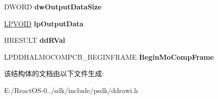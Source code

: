 \begin{DoxyCompactItemize}
\item 
\mbox{\label{struct___d_d_h_a_l___b_e_g_i_n_m_o_c_o_m_p_f_r_a_m_e_d_a_t_a_a2f12b691ba992253694f50dd24632cef}} 
D\+W\+O\+RD {\bfseries dw\+Output\+Data\+Size}
\item 
\mbox{\label{struct___d_d_h_a_l___b_e_g_i_n_m_o_c_o_m_p_f_r_a_m_e_d_a_t_a_ae0e05b192349adaa4786d4c91bf3ef9e}} 
\hyperlink{interfacevoid}{L\+P\+V\+O\+ID} {\bfseries lp\+Output\+Data}
\item 
\mbox{\label{struct___d_d_h_a_l___b_e_g_i_n_m_o_c_o_m_p_f_r_a_m_e_d_a_t_a_a2bb7e94003947cd1880a5608c4d97099}} 
H\+R\+E\+S\+U\+LT {\bfseries dd\+R\+Val}
\item 
\mbox{\label{struct___d_d_h_a_l___b_e_g_i_n_m_o_c_o_m_p_f_r_a_m_e_d_a_t_a_a1d2f5a0e94c0962e1c7bca8facd932d0}} 
L\+P\+D\+D\+H\+A\+L\+M\+O\+C\+O\+M\+P\+C\+B\+\_\+\+B\+E\+G\+I\+N\+F\+R\+A\+ME {\bfseries Begin\+Mo\+Comp\+Frame}
\end{DoxyCompactItemize}


该结构体的文档由以下文件生成\+:\begin{DoxyCompactItemize}
\item 
E\+:/\+React\+O\+S-\/0../sdk/include/psdk/ddrawi.\+h\end{DoxyCompactItemize}
